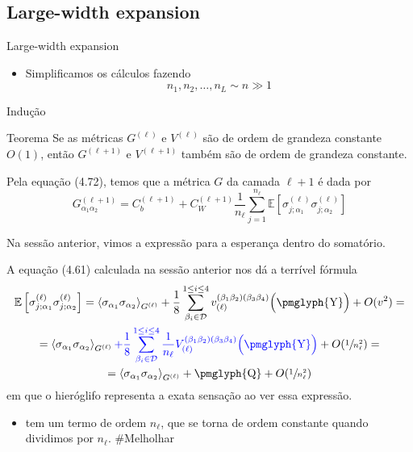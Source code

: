 \documentclass{beamer}
\newcommand{\EE}{\mathbb{E}}
\newcommand{\Dcal}{\mathcal{D}}
\def\mi#1{{\alpha_{#1}}}
\def\mj#1{\beta_{#1}}
\def\eell{{(\ell)}}
\def\eellum{{(\ell+1)}}
\newcommand{\Gnormal}[3]{{G^{(#1)}_{\mi{#2}\mi{#3}}}}
\newcommand{\Verticeinvb}[5]{V_{(#1)}^{(\mj#2\mj#3)(\mj#4\mj#5)}}
\newcommand{\Expectation}[2]{\left\langle #1 \right\rangle_{#2}}
\begin{document}
\subsection{Large-width expansion}

\begin{frame}{Large-width expansion}
	\begin{itemize}
		\item Simplificamos os cálculos fazendo 
		\begin{equation*}\tag{4.84}
			n_1, n_2, \ldots, n_L \sim n \gg 1 
		\end{equation*} 
	\end{itemize}
\end{frame}

\begin{frame}{Indução}
	\begin{block}{Teorema}
		Se as métricas $G^\eell$ e $V^\eell$ são de ordem de grandeza constante $O(1)$, então $G^\eellum$ e $V^\eellum$ também são de ordem de grandeza constante.
	\end{block}
\end{frame}

\begin{frame}
	Pela equação (4.72), temos que a métrica $G$ da camada $\ell+1$ é dada por
	\begin{equation*}
		\Gnormal{\ell+1}12 = C_b^\eellum + C_W^\eellum\frac{1}{n_\ell}\sum_{j=1}^{n_\ell}  \EE\left[\sigma_{j;\mi1}^\eell\sigma_{j;\mi2}^\eell\right]
	\end{equation*}

	Na sessão anterior, vimos a expressão para a esperança dentro do somatório.
\end{frame}

\begin{frame}
	A equação (4.61) calculada na sessão anterior nos dá a terrível fórmula 
	{\small
	\begin{multline*}
		\EE\left[\sigma_{j;\mi1}^\eell\sigma_{j;\mi2}^\eell\right] = \Expectation{\sigma_\mi1\sigma_\mi2}{G^\eell}  + \frac{1}{8} \sum_{\mj{i}\in\Dcal}^{1\le i \le 4}v_{\eell}^{(\mj1\mj2)(\mj3\mj4)}\Big( \text{\pmglyph{Y}} \Big) + O(v^2) =\\
		=  \Expectation{\sigma_\mi1\sigma_\mi2}{G^\eell} { \color{blue} + \frac{1}{8} \sum_{\mj{i}\in\Dcal}^{1\le i \le 4}\frac{1}{n_\ell}\Verticeinvb{\ell}1234\Big( \text{\pmglyph{Y}} \Big) } + O(\sfrac{1}{n_\ell^2}) = \\
		= \Expectation{\sigma_\mi1\sigma_\mi2}{G^\eell} + \text{\pmglyph{Q}}  + O(\sfrac{1}{n_\ell^2})
	\end{multline*}
	}
	em que o hieróglifo  representa a exata sensação ao ver essa expressão. 
	\medskip
	\begin{itemize}
		\item  {} tem um termo de ordem $n_\ell$, que se torna de ordem constante quando dividimos por $n_\ell$. \#Melholhar
	\end{itemize}
\end{frame}
\end{document}
